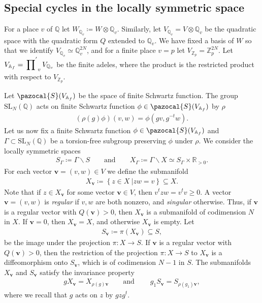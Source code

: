\documentclass[twoside,a4paper,10pt]{article} %
\newcommand{\8}{\infty}
\newcommand{\Z}{\mathbb{Z}}
\newcommand{\vbf}{\mathbf{v}}
\newcommand{\SL}{\mathrm{SL}}
\newcommand{\R}{\mathbb{R}}
\newcommand{\A}{\mathbb{A}}
\newcommand{\Q}{\mathbb{Q}}
\newcommand{\Scal}{\pazocal{S}}
\theoremstyle{mytheoremstyle}
\theoremstyle{remark}
\numberwithin{equation}{section}
\begin{document}
 
 
 
 
 
 
 
 
 
 
\subsection{Special cycles in the locally symmetric space} \label{section special cycles} For a place $v$ of $\Q$ let $W_{\Q_v} \coloneqq W \otimes \Q_v$. Similarly, let $V_{\Q_v}=V \otimes \Q_v$ be the quadratic space with the quadratic form $Q$ extended to $\Q_v$. We have fixed a basis of $W$ so that we identify $V_{\Q_v} \simeq \Q_v^{2N}$, and for a finite place $v=p$ let $V_{\Z_p}=\Z_p^{2N}$. Let $V_{\A_f}=\sideset{}{^{'}} \prod_v V_{\Q_v}$ be the finite adeles, where the product is the restricted product with respect to $V_{\Z_p}$.

Let $\Scal(V_{\A_f})$ be the space of finite Schwartz function. The group $\SL_N(\Q)$ acts on finite Schwartz function $\phi \in \Scal(V_{\A_f})$ by $\rho$
\begin{align} \label{invariance of phi}
(\rho(g)\phi)(v,w) = \phi(gv,g^{-t}w).
\end{align}
Let us now fix a finite Schwartz function $\phi \in \Scal(V_{\A_f})$ and $\Gamma \subset \SL_N(\Q)$ be a torsion-free subgroup preserving $\phi$ under $\rho$. We consider the locally symmetric spaces
\begin{align}
S_\Gamma \coloneqq \Gamma \backslash S \qquad \textrm{and} \qquad X_\Gamma \coloneqq \Gamma \backslash X \simeq S_\Gamma \times \R_{>0}.
\end{align}
For each vector $\vbf=(v,w) \in V$ we define the submanifold
\begin{align}
X_\vbf \coloneqq \left \{ z \in X \ \vert zw=v \right \} \subseteq X.
\end{align}
Note that if $z \in X_\vbf$ for some vector $\vbf \in V$, then $v^tzw=v^tv \geq 0$. A vector $\vbf=(v,w)$ is {\em regular} if $v,w$ are both nonzero, and {\em singular} otherwise. Thus, if $\vbf$ is a regular vector with $Q(\vbf)>0$, then $X_\vbf$ is a submanifold of codimension $N$ in $X$. If $\vbf=0$, then $X_\vbf=X$, and otherwise $X_\vbf$ is empty. Let \begin{align}
S_\vbf \coloneqq \pi(X_\vbf) \subseteq S,
\end{align}
be the image under the projection $\pi \colon X \longrightarrow S$. If $\vbf$ is a regular vector with $Q(\vbf)>0$, then the restriction of the projection $\pi \colon X \longrightarrow S$ to $X_\vbf$ is a diffeomorphism onto $S_\vbf$, which is of codimension $N-1$ in $S$. The submanifolds $X_\vbf$ and $S_\vbf$ satisfy the invariance property
\begin{align}
gX_\vbf=X_{\rho(g) \vbf} \qquad \textrm{and} \qquad \ g_1S_\vbf=S_{\rho(g_1) \vbf},
\end{align}
where we recall that $g$ acts on $z$ by $gzg^t$.
\end{document}
